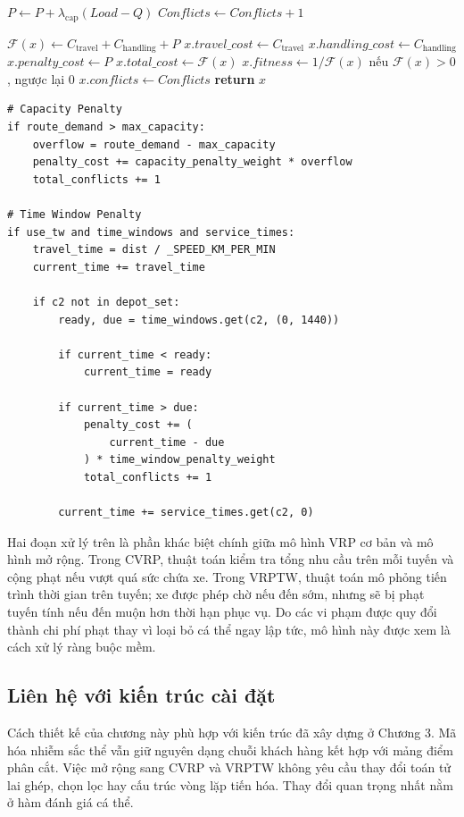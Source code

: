 \documentclass[12pt,a4paper]{article}
\numberwithin{figure}{subsection}
\newcounter{breakablealgocounter}
\newenvironment{breakablealgorithm}[1]
{
    \refstepcounter{breakablealgocounter}
    \begin{tcolorbox}[
        breakable,
        enhanced,
        colback=white,
        colframe=black!55,
        sharp corners,
        boxrule=0.5pt,
        left=2mm,
        right=2mm,
        top=1mm,
        bottom=1mm,
        title={Algorithm \thebreakablealgocounter. #1},
        fonttitle=\bfseries
    ]
}
{
    \end{tcolorbox}
}
\begin{document}
\begin{breakablealgorithm}{Đánh giá Fitness mở rộng cho CVRP và VRPTW}
\begin{algorithmic}[1]
        \State $P \gets P + \lambda_{\text{cap}}(Load-Q)$
        \State $Conflicts \gets Conflicts + 1$
    \EndIf
\EndFor

\State $\mathcal{F}(x) \gets C_{\text{travel}} + C_{\text{handling}} + P$
\State $x.travel\_cost \gets C_{\text{travel}}$
\State $x.handling\_cost \gets C_{\text{handling}}$
\State $x.penalty\_cost \gets P$
\State $x.total\_cost \gets \mathcal{F}(x)$
\State $x.fitness \gets 1/\mathcal{F}(x)$ nếu $\mathcal{F}(x)>0$, ngược lại $0$
\State $x.conflicts \gets Conflicts$
\State \textbf{return} $x$
\end{algorithmic}
\end{breakablealgorithm}

\begin{verbatim}
# Capacity Penalty
if route_demand > max_capacity:
    overflow = route_demand - max_capacity
    penalty_cost += capacity_penalty_weight * overflow
    total_conflicts += 1

# Time Window Penalty
if use_tw and time_windows and service_times:
    travel_time = dist / _SPEED_KM_PER_MIN
    current_time += travel_time

    if c2 not in depot_set:
        ready, due = time_windows.get(c2, (0, 1440))

        if current_time < ready:
            current_time = ready

        if current_time > due:
            penalty_cost += (
                current_time - due
            ) * time_window_penalty_weight
            total_conflicts += 1

        current_time += service_times.get(c2, 0)
\end{verbatim}
Hai đoạn xử lý trên là phần khác biệt chính giữa mô hình VRP cơ bản và mô hình mở rộng. Trong CVRP, thuật toán kiểm tra tổng nhu cầu trên mỗi tuyến và cộng phạt nếu vượt quá sức chứa xe. Trong VRPTW, thuật toán mô phỏng tiến trình thời gian trên tuyến; xe được phép chờ nếu đến sớm, nhưng sẽ bị phạt tuyến tính nếu đến muộn hơn thời hạn phục vụ. Do các vi phạm được quy đổi thành chi phí phạt thay vì loại bỏ cá thể ngay lập tức, mô hình này được xem là cách xử lý ràng buộc mềm.

\subsection{Liên hệ với kiến trúc cài đặt}

Cách thiết kế của chương này phù hợp với kiến trúc đã xây dựng ở Chương 3. Mã hóa nhiễm sắc thể vẫn giữ nguyên dạng chuỗi khách hàng kết hợp với mảng điểm phân cắt. Việc mở rộng sang CVRP và VRPTW không yêu cầu thay đổi toán tử lai ghép, chọn lọc hay cấu trúc vòng lặp tiến hóa. Thay đổi quan trọng nhất nằm ở hàm đánh giá cá thể.
\end{document}
